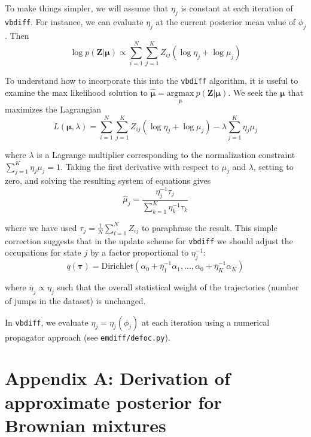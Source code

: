 \documentclass{article}
\let\vec\boldsymbol
\begin{document}
To make things simpler, we will assume that $\eta_{j}$ is constant
at each iteration of \verb|vbdiff|. For instance, we can 
evaluate $\eta_{j}$ at the current posterior mean value of $\phi_{j}$.
Then
\[
    \log p \left( \vec{Z} | \boldsymbol{\mu} \right) \propto \sum\limits_{i=1}^{N} \sum\limits_{j=1}^{K} Z_{ij} \left(
        \log \eta_{j} + \log \mu_{j}
    \right)
\]

To understand how to incorporate this into the \verb|vbdiff|
algorithm, it is useful to examine the max likelihood solution to
$\hat{\boldsymbol{\mu}} = \underset{\boldsymbol{\mu}}{\text{argmax}} \: p \left( \vec{Z} | \boldsymbol{\mu} \right)$. 
We seek the $\boldsymbol{\mu}$ that maximizes the Lagrangian
\[
    L(\boldsymbol{\mu}, \lambda) = \sum\limits_{i=1}^{N} \sum\limits_{j=1}^{K} Z_{ij} \left(
        \log \eta_{j} + \log \mu_{j}
    \right) - \lambda \sum\limits_{j=1}^{K} \eta_{j} \mu_{j}
\]

where $\lambda$ is a Lagrange multiplier corresponding to the
normalization constraint $\sum_{j=1}^{K} \eta_{j} \mu_{j} = 1$.
Taking the first derivative with respect to $\mu_{j}$ and $\lambda$,
setting to zero, and solving the resulting system of equations gives
\[
    \hat{\mu}_{j} = \frac{\eta_{j}^{-1} \tau_{j}}{\sum\limits_{k=1}^{K} \eta_{k}^{-1} \tau_{k}}
\]

where we have used $\tau_{j} = \frac{1}{N} \sum\limits_{i=1}^{N} Z_{ij}$
to paraphrase the result. This simple correction suggests that
in the update scheme for \verb|vbdiff| we should adjust the
occupations for state $j$ by a factor proportional to $\eta_{j}^{-1}$:
\[
    q \left( \boldsymbol{\tau} \right) = \text{Dirichlet} \left(
        \alpha_{0} + \overline{\eta}_{1}^{-1} \alpha_{1},
        ...,
        \alpha_{0} + \overline{\eta}_{K}^{-1} \alpha_{K}
    \right)
\]

where $\overline{\eta}_{j} \propto \eta_{j}$ such that the overall
statistical weight of the trajectories (number of jumps in the dataset)
is unchanged. \newline

In \verb|vbdiff|, we evaluate $\eta_{j} = \eta_{j} (\phi_{j})$
at each iteration using a numerical propagator approach
(see \verb|emdiff/defoc.py|).

\appendix

\section{Appendix A: Derivation of approximate posterior for Brownian mixtures}\label{appendix:derivation_approx_posterior}
\end{document}
